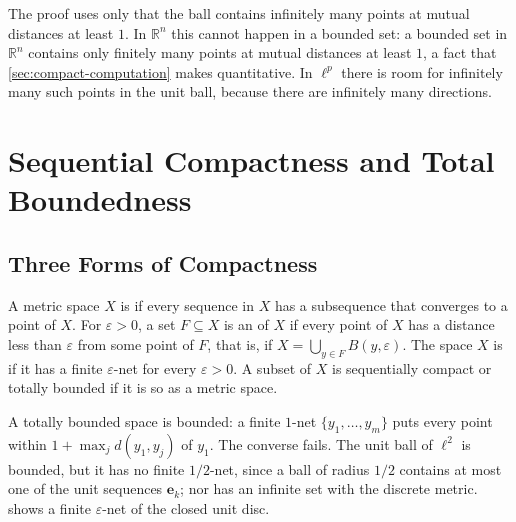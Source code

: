 The proof uses only that the ball contains infinitely many points at mutual distances at least $1$. In $\mathbb R^n$ this cannot happen in a bounded set: a bounded set in $\mathbb R^n$ contains only finitely many points at mutual distances at least $1$, a fact that \cref{sec:compact-computation} makes quantitative. In $\ell^p$ there is room for infinitely many such points in the unit ball, because there are infinitely many directions.

\section{Sequential Compactness and Total Boundedness}
\label{sec:sequential-compactness}

\subsection{Three Forms of Compactness}

\begin{definition}
\label{def:totally-bounded}
A metric space $X$ is  if every sequence in $X$ has a subsequence that converges to a point of $X$. For $\varepsilon>0$, a set $F\subseteq X$ is an  of $X$ if every point of $X$ has a distance less than $\varepsilon$ from some point of $F$, that is, if $X=\bigcup_{y\in F}B(y,\varepsilon)$. The space $X$ is  if it has a finite $\varepsilon$-net for every $\varepsilon>0$. A subset of $X$ is sequentially compact or totally bounded if it is so as a metric space.
\end{definition}

A totally bounded space is bounded: a finite $1$-net $\{y_1,\ldots,y_m\}$ puts every point within $1+\max_jd(y_1,y_j)$ of $y_1$. The converse fails. The unit ball of $\ell^2$ is bounded, but it has no finite $1/2$-net, since a ball of radius $1/2$ contains at most one of the unit sequences $\mathbf e_k$; nor has an infinite set with the discrete metric.  shows a finite $\varepsilon$-net of the closed unit disc.

